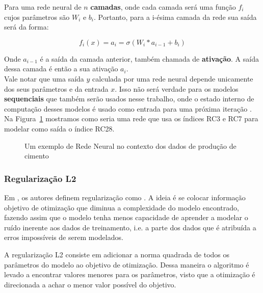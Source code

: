 Para uma rede neural de $n$ \textbf{camadas}, onde cada camada será uma função
$f_i$ cujos parâmetros são $W_i$ e $b_i$. Portanto, para a i-ésima camada da rede
sua saída será da forma: 

\[ f_i (x)=  a_i = \sigma(W_i*a_{i-1} + b_i) \]

Onde $a_{i-1}$ é a saída da camada anterior, também chamada de
\textbf{ativação}. A saída dessa camada é então a sua ativação $a_i$. \\ 

Vale notar que uma saída $y$ calculada por uma rede neural depende unicamente dos
seus parâmetros e da entrada $x$. Isso não será verdade para os modelos
\textbf{sequenciais} que também serão usados nesse trabalho, onde o estado
interno de computação desses modelos é usado como entrada para uma próxima
iteração \citep{dlbook}. \\

Na Figura~\ref{fig:nn} mostramos como seria uma rede que usa os índices RC3 e RC7 para
modelar como saída o índice RC28. \\  

\begin{figure}
  \centering
  
  \caption{Um exemplo de Rede Neural no contexto dos dados de produção de cimento}
  \label{fig:nn}
\end{figure}


\bigskip

\subsubsection{Regularização L2}

Em \cite{dlbook}, os autores definem regularização como . A ideia é se colocar informação objetivo de 
otimização que diminua a complexidade do modelo encontrado, fazendo assim
que o modelo tenha menos capacidade de aprender a modelar o ruído inerente
aos dados de treinamento, i.e. a parte dos dados que é atribuída a erros
impossíveis de serem modelados.

A regularização L2 consiste em adicionar a norma quadrada de todos os parâmetros
do modelo ao objetivo de otimização. Dessa maneira o algoritmo é levado a
encontrar valores menores para os parâmetros, visto que a otimização é
direcionada a achar o menor valor possível do objetivo.



